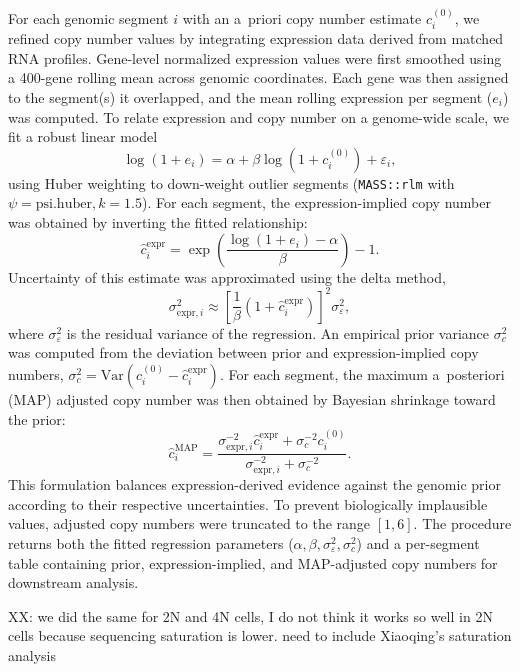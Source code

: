 \documentclass[11pt,notitlepage]{article}
\begin{document}
For each genomic segment \(i\) with an a~priori copy number estimate \(c_i^{(0)}\), we refined copy number values by integrating expression data derived from matched RNA profiles. Gene-level normalized expression values were first smoothed using a 400-gene rolling mean across genomic coordinates. Each gene was then assigned to the segment(s) it overlapped, and the mean rolling expression per segment (\(e_i\)) was computed. To relate expression and copy number on a genome-wide scale, we fit a robust linear model
\[
\log(1 + e_i) = \alpha + \beta \log(1 + c_i^{(0)}) + \varepsilon_i,
\]
using Huber weighting to down-weight outlier segments (\texttt{MASS::rlm} with \(\psi = \text{psi.huber}, k=1.5\)).  
For each segment, the expression-implied copy number was obtained by inverting the fitted relationship:
\[
\hat{c}^{\text{expr}}_i = \exp\left(\frac{\log(1 + e_i) - \alpha}{\beta}\right) - 1.
\]
Uncertainty of this estimate was approximated using the delta method,
\[
\sigma_{\text{expr},i}^2 \approx \left[\frac{1}{\beta}(1 + \hat{c}^{\text{expr}}_i)\right]^2 \sigma_\varepsilon^2,
\]
where \(\sigma_\varepsilon^2\) is the residual variance of the regression.  
An empirical prior variance \(\sigma_c^2\) was computed from the deviation between prior and expression-implied copy numbers, \( \sigma_c^2 = \mathrm{Var}(c_i^{(0)} - \hat{c}^{\text{expr}}_i) \).  
For each segment, the maximum a~posteriori (MAP) adjusted copy number was then obtained by Bayesian shrinkage toward the prior:
\[
\hat{c}^{\text{MAP}}_i = \frac{\sigma_{\text{expr},i}^{-2} \hat{c}^{\text{expr}}_i + \sigma_c^{-2} c_i^{(0)}}{\sigma_{\text{expr},i}^{-2} + \sigma_c^{-2}}.
\]
This formulation balances expression-derived evidence against the genomic prior according to their respective uncertainties.  
To prevent biologically implausible values, adjusted copy numbers were truncated to the range \([1,6]\).  
The procedure returns both the fitted regression parameters (\(\alpha, \beta, \sigma_\varepsilon^2, \sigma_c^2\)) and a per-segment table containing prior, expression-implied, and MAP-adjusted copy numbers for downstream analysis.

XX: we did the same for 2N and 4N cells, I do not think it works so well in 2N cells because sequencing saturation is lower. need to include Xiaoqing's saturation analysis



\clearpage
\end{document}
